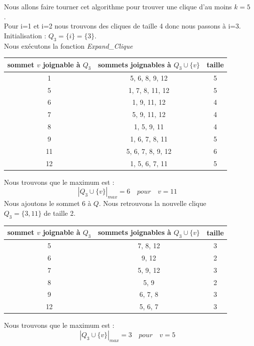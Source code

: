 \documentclass{article}
\begin{document}
Nous allons faire tourner cet algorithme pour trouver une clique d'au moins $k=5$. \\
Pour i=1 et i=2 nous trouvons des cliques de taille 4 donc nous passons à i=3.
Initialisation : $Q_3=\{i\}=\{3\}$. \\
Nous exécutons la fonction \textit{Expand\_Clique}
\begin{center}
  \begin{tabular}{|c|c|c|}
    \hline
    sommet $v$ joignable à $Q_3$ & sommets joignables à $Q_3\cup\{v\}$ & taille \\ \hline
    \hline
    1 	& 5, 6, 8, 9, 12  	& 5 \\ \hline
    5   & 1, 7, 8, 11, 12   & 5 \\ \hline
    6 	& 1, 9, 11, 12  	  & 4 \\ \hline
    7 	& 5, 9, 11, 12  	  & 4 \\ \hline
    8 	& 1, 5, 9, 11 	    & 4 \\ \hline
    9 	& 1, 6, 7, 8, 11 	  & 5 \\ \hline
    11 	& 5, 6, 7, 8, 9, 12 & 6 \\ \hline
    12 	& 1, 5, 6, 7, 11  	& 5 \\ \hline
  \end{tabular}
\end{center}
Nous trouvons que le maximum est :
\begin{displaymath}
  |Q_3 \cup \{v\}|_{max}=6 \quad pour \quad v=11
\end{displaymath}
Nous ajoutons le sommet $6$ à $Q$. Nous retrouvons la nouvelle clique \\
$Q_3=\{3, 11\}$ de taille 2.
\begin{center}
  \begin{tabular}{|c|c|c|}
    \hline
    sommet $v$ joignable à $Q_3$ & sommets joignables à $Q_3\cup\{v\}$ & taille \\ \hline
    \hline
    5 	& 7, 8, 12 	& 3 \\ \hline
    6 	& 9, 12 	  & 2 \\ \hline
    7 	& 5, 9, 12 	& 3 \\ \hline
    8 	& 5, 9 	    & 2 \\ \hline
    9 	& 6, 7, 8 	& 3 \\ \hline
    12 	& 5, 6, 7 	& 3 \\ \hline
  \end{tabular}
\end{center}
Nous trouvons que le maximum est :
\begin{displaymath}
  |Q_3 \cup \{v\}|_{max}=3 \quad pour \quad v=5
\end{displaymath}
\end{document}
